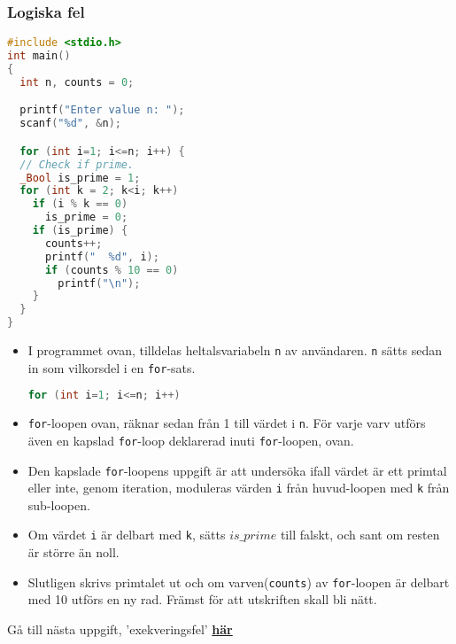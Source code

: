 \documentclass[../main.tex]{subfiles}
\begin{document}
\subsubsection{Logiska fel}
\label{sec:logic}
\begin{lstlisting}[language=c]
#include <stdio.h>
int main() 
{
  int n, counts = 0;

  printf("Enter value n: ");
  scanf("%d", &n);

  for (int i=1; i<=n; i++) {
  // Check if prime.
  _Bool is_prime = 1;
  for (int k = 2; k<i; k++)
    if (i % k == 0)
      is_prime = 0;
    if (is_prime) {
      counts++;
      printf("  %d", i);
      if (counts % 10 == 0)
        printf("\n");
    }
  }
}
\end{lstlisting}

\begin{itemize}

    \item I programmet ovan, tilldelas heltalsvariabeln \texttt{n} av användaren.
    \texttt{n} sätts sedan in som vilkorsdel i en \texttt{for}-sats.
    
    \begin{lstlisting}[language=c]
    for (int i=1; i<=n; i++)
    \end{lstlisting}
    
    \item \texttt{for}-loopen ovan, räknar sedan från 1 till värdet i \texttt{n}.
    För varje varv utförs även en kapslad \texttt{for}-loop deklarerad inuti \texttt{for}-loopen, ovan.
    
    \item Den kapslade \texttt{for}-loopens uppgift är att undersöka ifall värdet är ett primtal eller inte, genom iteration, moduleras värden \texttt{i} från huvud-loopen med \texttt{k} från sub-loopen.
    
    \item Om värdet \texttt{i} är delbart med \texttt{k}, sätts $is\_prime$ till falskt, och sant om resten är större än noll.
    
    \item Slutligen skrivs primtalet ut och om varven(\texttt{counts}) av \texttt{for}-loopen är delbart med 10 utförs en ny rad. Främst för att utskriften skall bli nätt.
    
\end{itemize}

\begin{tcolorbox}[colback=green!5!white,colframe=green!75!black]
  Gå till nästa uppgift, 'exekveringsfel' \hyperref[sec:c3]{\textbf{här}}
\end{tcolorbox}
\end{document}
